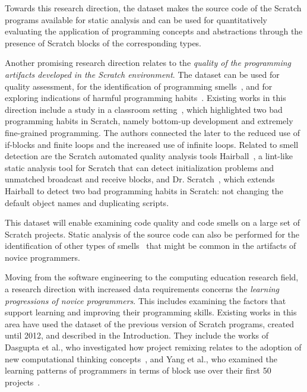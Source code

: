 \documentclass[10pt, conference]{IEEEtran}
\begin{document}
Towards this research direction, the dataset makes the source code of the Scratch programs available for static analysis and can be used for quantitatively evaluating the application of programming concepts and abstractions through the presence of Scratch blocks of the corresponding types.

Another promising research direction relates to the \textit{quality of the programming artifacts developed in the Scratch environment}.
The dataset can be used for quality assessment, for the identification of programming smells~\cite{Aivaloglou_2016}, and for exploring indications of harmful programming habits~\cite{Robles_2017}.
Existing works in this direction include a study in a classroom setting~\cite{Meerbaum_habits_2011}, which highlighted two bad programming habits in Scratch, namely bottom-up development and extremely fine-grained programming.
The authors connected the later to the reduced use of if-blocks and finite loops and the increased use of infinite loops.
Related to smell detection are the Scratch automated quality analysis tools Hairball~\cite{boe_hairball:_2013}, a lint-like static analysis tool for Scratch that can detect initialization problems and unmatched broadcast and receive blocks, and Dr. Scratch~\cite{moreno-leon_dr._2015}, which extends Hairball to detect two bad programming habits in Scratch: not changing the default object names and duplicating scripts.

This dataset will enable examining code quality and code smells on a large set of Scratch projects.
Static analysis of the source code can also be performed for the identification of other types of smells~\cite{fowler_refactoring:_1999} that might be common in the artifacts of novice programmers.

Moving from the software engineering to the computing education research field, a research direction with increased data requirements concerns the \textit{learning progressions of novice programmers}.
This includes examining the factors that support learning and improving their programming skills.
Existing works in this area have used the dataset of the previous version of Scratch programs, created until 2012, and described in the Introduction.
They include the works of Dasgupta et al., who investigated how project remixing relates to the adoption of new computational thinking concepts~\cite{Dasgupta_2016}, and Yang et al., who examined the learning patterns of programmers in terms of block use over their first 50 projects~\cite{yang_2015}.
\end{document}
